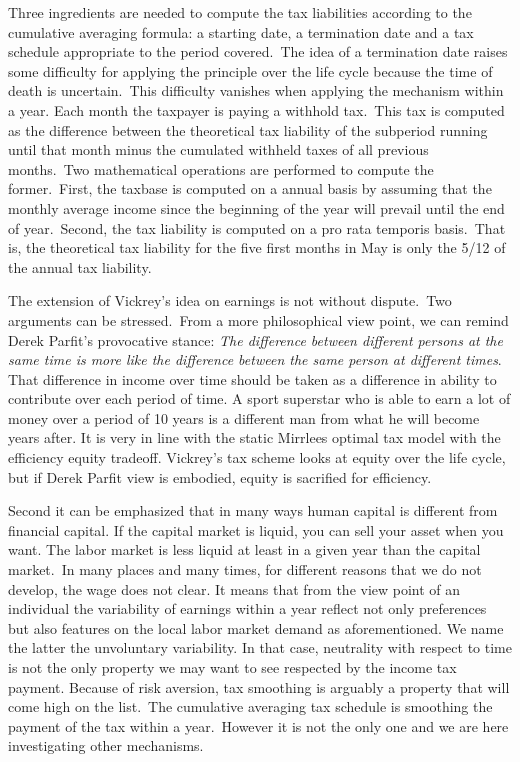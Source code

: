 Three ingredients are needed to compute the tax liabilities according to the
cumulative averaging formula: a starting date, a termination date and a tax
schedule appropriate to the period covered.\ The idea of a termination date
raises some difficulty for applying the principle over the life cycle because
the time of death is uncertain.\ This difficulty vanishes when applying the
mechanism within a year. Each month the taxpayer is paying a withhold
tax.\ This tax is computed as the difference between the theoretical tax
liability of the subperiod running until that month minus the cumulated
withheld taxes of all previous months.\ Two mathematical operations are
performed to compute the former.\ First, the taxbase is computed on a annual
basis by assuming that the monthly average income since the beginning of the
year will prevail until the end of year.\ Second, the tax liability is
computed on a pro rata temporis basis.\ That is, the theoretical tax liability
for the five first months in May is only the 5/12 of the annual tax liability.

The extension of Vickrey's idea on earnings is not without dispute.\ Two
arguments can be stressed.\ From a more philosophical view point, we can
remind Derek Parfit's provocative stance: \textit{The difference between
different persons at the same time is more like the difference between the
same person at different times}. That difference in income over time should be
taken as a difference in ability to contribute over each period of time. A
sport superstar who is able to earn a lot of money over a period of 10 years
is a different man from what he will become years after. It is very in line
with the static Mirrlees optimal tax model with the efficiency equity
tradeoff. Vickrey's tax scheme looks at equity over the life cycle, but if
Derek Parfit view is embodied, equity is sacrified for efficiency.

Second it can be emphasized that in many ways human capital is different from
financial capital. If the capital market is liquid, you can sell your asset
when you want. The labor market is less liquid at least in a given year than
the capital market.\ In many places and many times, for different reasons that
we do not develop, the wage does not clear. It means that from the view point
of an individual the variability of earnings within a year reflect not only
preferences but also features on the local labor market demand as
aforementioned. We name the latter the unvoluntary variability. In that case,
neutrality with respect to time is not the only property we may want to see
respected by the income tax payment. Because of risk aversion, tax smoothing
is arguably a property that will come high on the list.\ The cumulative
averaging tax schedule is smoothing the payment of the tax within a
year.\ However it is not the only one and we are here investigating other mechanisms.\ 

